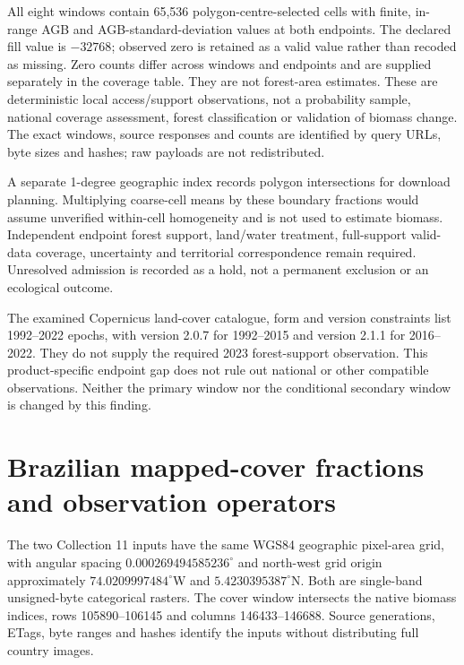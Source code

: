 \documentclass[11pt,a4paper]{article}
\begin{document}
All eight windows contain 65,536 polygon-centre-selected cells with finite, in-range AGB and AGB-standard-deviation values at both endpoints. The declared fill value is $-32768$; observed zero is retained as a valid value rather than recoded as missing. Zero counts differ across windows and endpoints and are supplied separately in the coverage table. They are not forest-area estimates. These are deterministic local access/support observations, not a probability sample, national coverage assessment, forest classification or validation of biomass change. The exact windows, source responses and counts are identified by query URLs, byte sizes and hashes; raw payloads are not redistributed.

A separate 1-degree geographic index records polygon intersections for download planning. Multiplying coarse-cell means by these boundary fractions would assume unverified within-cell homogeneity and is not used to estimate biomass. Independent endpoint forest support, land/water treatment, full-support valid-data coverage, uncertainty and territorial correspondence remain required. Unresolved admission is recorded as a hold, not a permanent exclusion or an ecological outcome.

The examined Copernicus land-cover catalogue, form and version constraints list 1992--2022 epochs, with version 2.0.7 for 1992--2015 and version 2.1.1 for 2016--2022. They do not supply the required 2023 forest-support observation. This product-specific endpoint gap does not rule out national or other compatible observations. Neither the primary window nor the conditional secondary window is changed by this finding.

\section{Brazilian mapped-cover fractions and observation operators}

The two Collection 11 inputs have the same WGS84 geographic pixel-area grid, with angular spacing $0.000269494585236^\circ$ and north-west grid origin approximately $74.0209997484^\circ$W and $5.4230395387^\circ$N. Both are single-band unsigned-byte categorical rasters. The cover window intersects the native biomass indices, rows 105890--106145 and columns 146433--146688. Source generations, ETags, byte ranges and hashes identify the inputs without distributing full country images.
\end{document}
